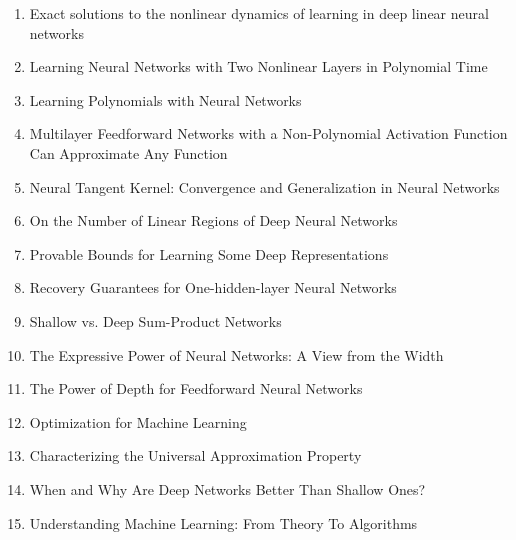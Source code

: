 \documentclass[acmlarge]{acmart}
\begin{document}
\begin{enumerate}
	\item Exact solutions to the nonlinear dynamics of learning in deep linear neural networks \cite{Saxe2014ExactST} 

	\item Learning Neural Networks with Two Nonlinear Layers in Polynomial Time \cite{Goel2019LearningNN} 

	\item Learning Polynomials with Neural Networks \cite{Andoni2014LearningPW} 

	\item Multilayer Feedforward Networks with a Non-Polynomial Activation Function Can Approximate Any Function \cite{Leshno1993MultilayerFN} 

	\item Neural Tangent Kernel: Convergence and Generalization in Neural Networks \cite{Jacot2018NeuralTK} 

	\item On the Number of Linear Regions of Deep Neural Networks \cite{Montfar2014OnTN} 

	\item Provable Bounds for Learning Some Deep Representations \cite{Arora2014ProvableBF} 

	\item Recovery Guarantees for One-hidden-layer Neural Networks \cite{Zhong2017RecoveryGF} 

	\item Shallow vs. Deep Sum-Product Networks \cite{Delalleau2011ShallowVD} 

	\item The Expressive Power of Neural Networks: A View from the Width \cite{Lu2017TheEP} 

	\item The Power of Depth for Feedforward Neural Networks \cite{Eldan2016ThePO} 

	\item Optimization for Machine Learning \cite{10.5555/2051759} 

	\item Characterizing the Universal Approximation Property \cite{Kratsios2019CharacterizingTU} 

	\item When and Why Are Deep Networks Better Than Shallow Ones? \cite{Mhaskar2017WhenAW} 

	\item Understanding Machine Learning: From Theory To Algorithms \cite{David2015UnderstandingML} 


\end{enumerate}
\end{document}
